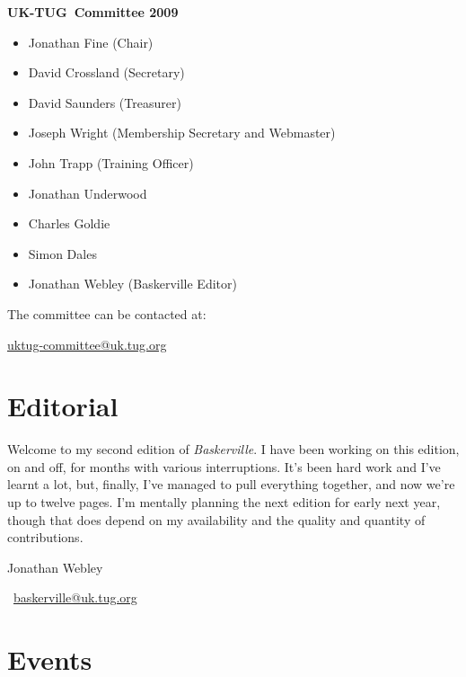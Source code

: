 \documentclass[a4paper,twoside,twocolumn]{article}
\def \ukt {UK-TUG}
\newcommand{\BV}{\textit{Baskerville}}
\begin{document}
\vspace{0.5cm}
\noindent \textbf{\ukt\ Committee 2009}

\begin{itemize}
   \setlength{\parskip}{1pt} %
   \item Jonathan Fine (Chair)
   \item David Crossland (Secretary)
   \item David Saunders (Treasurer)
   \item Joseph Wright (Membership Secretary and Webmaster)
   \item John Trapp (Training Officer)
   \item Jonathan Underwood
   \item Charles Goldie
   \item Simon Dales
   \item Jonathan Webley (Baskerville Editor)
\end{itemize}
The  committee can be contacted at:
\begin{center}
\href{mailto:uktug-committee@uk.tug.org}{uktug-committee@uk.tug.org}
\end{center}

\section{Editorial}
Welcome to my second edition of \BV. I have been working on this edition, on and off, for months with various interruptions. It's been hard work and I've learnt a lot, but, finally, I've managed to pull everything together, and now we're up to twelve pages. I'm mentally planning the next edition for early next year, though that does depend on my availability and the quality and quantity of contributions.


\hfill Jonathan Webley

\hfill \ \href{mailto:baskerville@uk.tug.org}{baskerville@uk.tug.org}

\section{Events}
\end{document}
